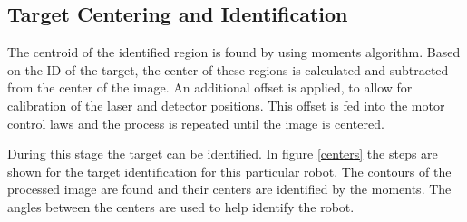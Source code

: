 \documentclass[botnum, fleqn]{unmeethesis}
\begin{document}
\clearpage



\subsection*{Target Centering and Identification}
The centroid of the identified region is found by using moments algorithm. Based on the ID of the target, the center of these regions is calculated and subtracted from the center of the image. An additional offset is applied, to allow for calibration of the laser and detector positions. This offset is fed into the motor control laws and the process is repeated until the image is centered.

During this stage the target can be identified. In figure \ref{centers} the steps are shown for the target identification for this particular robot. The contours of the processed image are found and their centers are identified by the moments. The angles between the centers are used to help identify the robot. 
\end{document}
